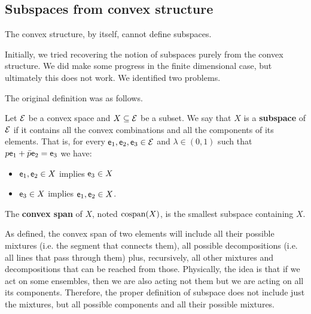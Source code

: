 \subsection{Subspaces from convex structure}\label{pm_es_failureConvexSubspace}

\begin{insight}
	The convex structure, by itself, cannot define subspaces.
\end{insight}

Initially, we tried recovering the notion of subspaces purely from the convex structure. We did make some progress in the finite dimensional case, but ultimately this does not work. We identified two problems.

The original definition was as follows.

\begin{defn}
	Let $\mathcal{E}$ be a convex space and $X \subseteq \mathcal{E}$ be a subset. We say that $X$ is a \textbf{subspace} of $\mathcal{E}$ if it contains all the convex combinations and all the components of its elements. That is, for every $\mathsf{e}_1, \mathsf{e}_2, \mathsf{e}_3 \in \mathcal{E}$ and $\lambda \in (0,1)$ such that $p \mathsf{e}_1 + \bar{p} \mathsf{e}_2 = \mathsf{e}_3$ we have:
	\begin{itemize}
		\item $\mathsf{e}_1, \mathsf{e}_2 \in X$ implies $\mathsf{e}_3 \in X$
		\item $\mathsf{e}_3 \in X$ implies $\mathsf{e}_1, \mathsf{e}_2 \in X$.
	\end{itemize}
	The \textbf{convex span} of $X$, noted $\mathrm{cospan}(X)$, is the smallest subspace containing $X$.
\end{defn}

\begin{remark}
	As defined, the convex span of two elements will include all their possible mixtures (i.e. the segment that connects them), all possible decompositions (i.e. all lines that pass through them) plus, recursively, all other mixtures and decompositions that can be reached from those. Physically, the idea is that if we act on some ensembles, then we are also acting not them but we are acting on all its components. Therefore, the proper definition of subspace does not include just the mixtures, but all possible components and all their possible mixtures.
\end{remark}

